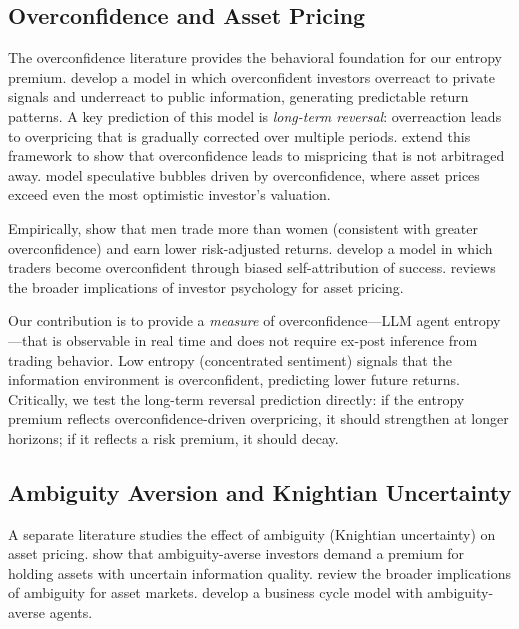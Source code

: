\documentclass[12pt,a4paper]{article}
\begin{document}
\subsection{Overconfidence and Asset Pricing}

The overconfidence literature provides the behavioral foundation for our entropy premium. \citet{Daniel1998} develop a model in which overconfident investors overreact to private signals and underreact to public information, generating predictable return patterns. A key prediction of this model is \textit{long-term reversal}: overreaction leads to overpricing that is gradually corrected over multiple periods. \citet{Daniel2001} extend this framework to show that overconfidence leads to mispricing that is not arbitraged away. \citet{ScheinkmanXiong2003} model speculative bubbles driven by overconfidence, where asset prices exceed even the most optimistic investor's valuation.

Empirically, \citet{BarberOdean2001} show that men trade more than women (consistent with greater overconfidence) and earn lower risk-adjusted returns. \citet{GervaisOdean2001} develop a model in which traders become overconfident through biased self-attribution of success. \citet{Hirshleifer2001} reviews the broader implications of investor psychology for asset pricing.

Our contribution is to provide a \textit{measure} of overconfidence---LLM agent entropy---that is observable in real time and does not require ex-post inference from trading behavior. Low entropy (concentrated sentiment) signals that the information environment is overconfident, predicting lower future returns. Critically, we test the \citet{Daniel1998} long-term reversal prediction directly: if the entropy premium reflects overconfidence-driven overpricing, it should strengthen at longer horizons; if it reflects a risk premium, it should decay.

\subsection{Ambiguity Aversion and Knightian Uncertainty}

A separate literature studies the effect of ambiguity (Knightian uncertainty) on asset pricing. \citet{EpsteinSchneider2008} show that ambiguity-averse investors demand a premium for holding assets with uncertain information quality. \citet{EpsteinSchneider2010} review the broader implications of ambiguity for asset markets. \citet{IlutSchneider2014} develop a business cycle model with ambiguity-averse agents.
\end{document}
